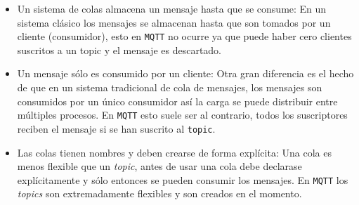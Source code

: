 \begin{itemize}\itemsep1pt \parskip0pt 
\item Un sistema de colas almacena un mensaje hasta que se consume: En un sistema
clásico los mensajes se almacenan hasta que son tomados por un cliente (consumidor),
esto en \texttt{MQTT} no ocurre ya que puede haber cero clientes suscritos a un
topic y el mensaje es descartado.
\item Un mensaje sólo es consumido por un cliente: Otra gran diferencia es el hecho
de que en un sistema tradicional de cola de mensajes, los mensajes son consumidos
por un único consumidor así la carga se puede distribuir entre múltiples procesos.
En \texttt{MQTT} esto suele ser al contrario, todos los suscriptores reciben el
mensaje si se han suscrito al \texttt{topic}.
\item Las colas tienen nombres y deben crearse de forma explícita: Una cola es
menos flexible que un \emph{topic}, antes de usar una cola debe declarase
explícitamente y sólo entonces se pueden consumir los mensajes. En \texttt{MQTT}
los \emph{topics} son extremadamente flexibles y son creados en el momento.
\end{itemize}
